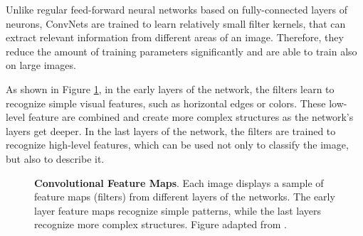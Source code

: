 \documentclass[12pt]{report}
\begin{document}
Unlike regular feed-forward neural networks based on fully-connected layers of neurons, ConvNets are trained to learn relatively small filter kernels, that can extract relevant information from different areas of an image. Therefore, they reduce the amount of training parameters significantly and are able to train also on large images.

As shown in Figure \ref{fig:conv_feats}, in the early layers of the network, the filters learn to recognize simple visual features, such as horizontal edges or colors. These low-level feature are combined and create more complex structures as the network's layers get deeper. In the last layers of the network, the filters are trained to recognize high-level features, which can be used not only to classify the image, but also to describe it.

\begin{figure}[h]
\centering
{}\hspace{.3cm}
\hspace{.3cm}
\caption{\label{fig:conv_feats} \textbf{Convolutional Feature Maps}. Each image displays a sample of feature maps (filters) from different layers of the networks. The early layer feature maps recognize simple patterns, while the last layers recognize more complex structures. Figure adapted from \cite{gandhi_build_2018}.}
\end{figure}
\end{document}
